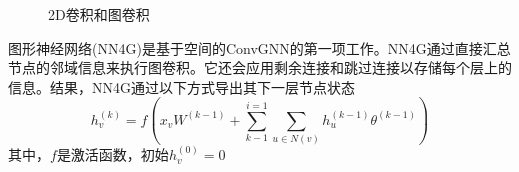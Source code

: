\begin{figure}[htbp]
	\centering 
	\caption{2D卷积和图卷积} %
	\label{fig:2DConvs_GConvs}  %
\end{figure}	

图形神经网络(NN4G)是基于空间的ConvGNN的第一项工作。NN4G通过直接汇总节点的邻域信息来执行图卷积。它还会应用剩余连接和跳过连接以存储每个层上的信息。结果，NN4G通过以下方式导出其下一层节点状态 
\[
h_v^{(k)}=f(x_vW^{(k-1)}+\sum_{k-1}^{i=1}\sum_{u\in N(v)}h_u^{(k-1)}\theta^{(k-1)})
\]
其中，$f$是激活函数，初始$h_v^{(0)}=0$


